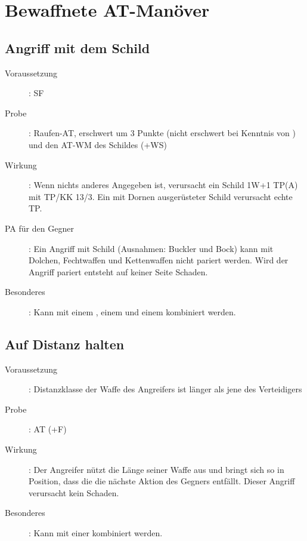 %

\section{Bewaffnete AT-Manöver}
\label{chap.bAT}

\subsection{Angriff mit dem Schild }
\label{chap.bAT.schild}
\begin{description}
    \item[Voraussetzung]: SF 
    \item[Probe]: Raufen-AT, erschwert um 3 Punkte (nicht erschwert bei
        Kenntnis von ) und den AT-WM des Schildes
        (+WS)
    \item[Wirkung]: Wenn nichts anderes Angegeben ist, verursacht ein Schild
        1W+1 TP(A) mit TP/KK 13/3. Ein mit Dornen ausgerüsteter Schild
        verursacht echte TP.
    \item[PA für den Gegner]: Ein Angriff mit Schild (Ausnahmen: Buckler und
        Bock) kann mit Dolchen, Fechtwaffen und Kettenwaffen nicht pariert
        werden. Wird der Angriff pariert entsteht auf keiner Seite Schaden.
    \item[Besonderes]: Kann mit einem , einem
         und einem 
        kombiniert werden.
\end{description}

\subsection{Auf Distanz halten }
\label{chap.bAT.distanz}
\begin{description}
    \item[Voraussetzung]: Distanzklasse der Waffe des
        Angreifers ist länger als jene des Verteidigers
    \item[Probe]: AT (+F)
    \item[Wirkung]: Der Angreifer nützt die Länge seiner Waffe aus und bringt
        sich so in Position, dass die die nächste Aktion des Gegners entfällt.
        Dieser Angriff verursacht kein Schaden.
    \item[Besonderes]: Kann mit einer  kombiniert werden.
\end{description}

